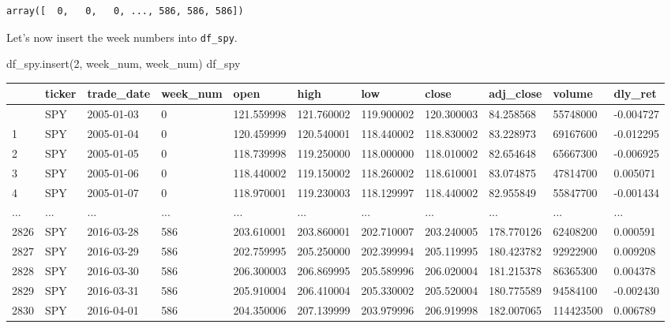 \documentclass[
  letterpaper,
  DIV=11,
  numbers=noendperiod]{scrreprt}
\newenvironment{Shaded}{\begin{snugshade}}{\end{snugshade}}
\newcommand{\DecValTok}[1]{\textcolor[rgb]{0.68,0.00,0.00}{#1}}
\newcommand{\NormalTok}[1]{\textcolor[rgb]{0.00,0.23,0.31}{#1}}
\newcommand{\StringTok}[1]{\textcolor[rgb]{0.13,0.47,0.30}{#1}}
\begin{document}
\begin{verbatim}
array([  0,   0,   0, ..., 586, 586, 586])
\end{verbatim}

Let's now insert the week numbers into \texttt{df\_spy}.

\begin{Shaded}
\begin{Highlighting}[]
\NormalTok{df\_spy.insert(}\DecValTok{2}\NormalTok{, }\StringTok{\textquotesingle{}week\_num\textquotesingle{}}\NormalTok{, week\_num)}
\NormalTok{df\_spy}
\end{Highlighting}
\end{Shaded}

\begin{longtable}[]{@{}lllllllllll@{}}
\toprule\noalign{}
& ticker & trade\_date & week\_num & open & high & low & close &
adj\_close & volume & dly\_ret \\
\midrule\noalign{}
\endhead
\bottomrule\noalign{}
\endlastfoot
0 & SPY & 2005-01-03 & 0 & 121.559998 & 121.760002 & 119.900002 &
120.300003 & 84.258568 & 55748000 & -0.004727 \\
1 & SPY & 2005-01-04 & 0 & 120.459999 & 120.540001 & 118.440002 &
118.830002 & 83.228973 & 69167600 & -0.012295 \\
2 & SPY & 2005-01-05 & 0 & 118.739998 & 119.250000 & 118.000000 &
118.010002 & 82.654648 & 65667300 & -0.006925 \\
3 & SPY & 2005-01-06 & 0 & 118.440002 & 119.150002 & 118.260002 &
118.610001 & 83.074875 & 47814700 & 0.005071 \\
4 & SPY & 2005-01-07 & 0 & 118.970001 & 119.230003 & 118.129997 &
118.440002 & 82.955849 & 55847700 & -0.001434 \\
... & ... & ... & ... & ... & ... & ... & ... & ... & ... & ... \\
2826 & SPY & 2016-03-28 & 586 & 203.610001 & 203.860001 & 202.710007 &
203.240005 & 178.770126 & 62408200 & 0.000591 \\
2827 & SPY & 2016-03-29 & 586 & 202.759995 & 205.250000 & 202.399994 &
205.119995 & 180.423782 & 92922900 & 0.009208 \\
2828 & SPY & 2016-03-30 & 586 & 206.300003 & 206.869995 & 205.589996 &
206.020004 & 181.215378 & 86365300 & 0.004378 \\
2829 & SPY & 2016-03-31 & 586 & 205.910004 & 206.410004 & 205.330002 &
205.520004 & 180.775589 & 94584100 & -0.002430 \\
2830 & SPY & 2016-04-01 & 586 & 204.350006 & 207.139999 & 203.979996 &
206.919998 & 182.007065 & 114423500 & 0.006789 \\
\end{longtable}
\end{document}
